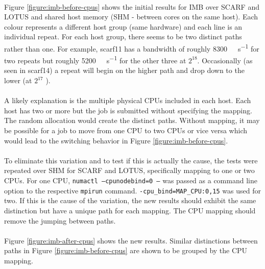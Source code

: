 \documentclass{article}
\begin{document}
            \paragraph{}
            Figure \ref{figure:imb-before-cpus} shows the initial results for IMB over SCARF and LOTUS and shared host memory (SHM - between cores on the same host). Each colour represents a different host group (same hardware) and each line is an individual repeat. For each host group, there seems to be two distinct paths rather than one. For example, scarf11 has a bandwidth of roughly \SI{8300}{\mega\byte\per\second} for two repeats but roughly \SI{5200}{\mega\byte\per\second} for the other three at $2^{18}$\si{\byte}. Occasionally (as seen in scarf14) a repeat will begin on the higher path and drop down to the lower (at $2^{17}$ \si{\byte}).

            \paragraph{}
            A likely explanation is the multiple physical CPUs included in each host. Each host has two or more but the job is submitted without specifying the mapping. The random allocation would create the distinct paths. Without mapping, it may be possible for a job to move from one CPU to two CPUs or vice versa which would lead to the switching behavior in Figure \ref{figure:imb-before-cpus}.

            \paragraph{}
            To eliminate this variation and to test if this is actually the cause, the tests were repeated over SHM for SCARF and LOTUS, specifically mapping to one or two CPUs. For one CPU, \texttt{numactl --cpunodebind=0 --} was passed as a command line option to the respective \texttt{mpirun} command. \texttt{-cpu_bind=MAP_CPU:0,15} was used for two. If this is the cause of the variation, the new results should exhibit the same distinction but have a unique path for each mapping. The CPU mapping should remove the jumping between paths.

            \paragraph{}
            Figure \ref{figure:imb-after-cpus} shows the new results. Similar distinctions between paths in Figure \ref{figure:imb-before-cpus} are shown to be grouped by the CPU mapping.
\end{document}
